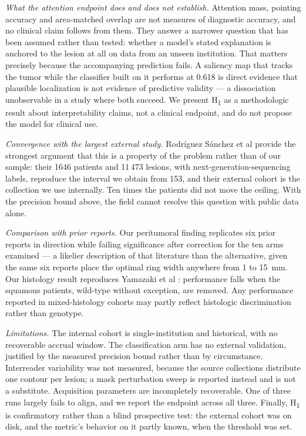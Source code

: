 \documentclass[11pt]{article}
\begin{document}
\textit{What the attention endpoint does and does not establish.} Attention mass,
pointing accuracy and area-matched overlap are not measures of diagnostic
accuracy, and no clinical claim follows from them. They answer a narrower question
that has been assumed rather than tested: whether a model's stated explanation is
anchored to the lesion at all on data from an unseen institution. That matters
precisely because the accompanying prediction fails. A saliency map that tracks
the tumor while the classifier built on it performs at 0.618 is direct evidence
that plausible localization is not evidence of predictive validity --- a
dissociation unobservable in a study where both succeed. We present
H\textsubscript{1} as a methodologic result about interpretability claims, not a
clinical endpoint, and do not propose the model for clinical use.

\textit{Convergence with the largest external study.} Rodríguez Sánchez et al
\citep{rodriguez2026} provide the strongest argument that this is a property of
the problem rather than of our sample: their 1646 patients and 11\,473 lesions,
with next-generation-sequencing labels, reproduce the interval we obtain from 153,
and their external cohort is the collection we use internally. Ten times the
patients did not move the ceiling. With the precision bound above, the field
cannot resolve this question with public data alone.

\textit{Comparison with prior reports.} Our peritumoral finding replicates six
prior reports in direction while failing significance after correction for the ten
arms examined --- a likelier description of that literature than the alternative,
given the same six reports place the optimal ring width anywhere from 1 to 15~mm.
Our histology result reproduces Yamazaki et al \citep{yamazaki2022}: performance
falls when the squamous patients, wild-type without exception, are removed. Any
performance reported in mixed-histology cohorts may partly reflect histologic
discrimination rather than genotype.

\textit{Limitations.} The internal cohort is single-institution and historical,
with no recoverable accrual window. The classification arm has no external
validation, justified by the measured precision bound rather than by circumstance.
Interreader variability was not measured, because the source collections
distribute one contour per lesion; a mask perturbation sweep is reported instead
and is not a substitute. Acquisition parameters are incompletely recoverable. One
of three runs largely fails to align, and we report the endpoint across all three.
Finally, H\textsubscript{1} is confirmatory rather than a blind prospective test:
the external cohort was on disk, and the metric's behavior on it partly known,
when the threshold was set.
\end{document}
